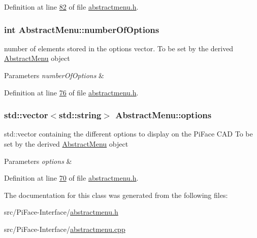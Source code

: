 Definition at line \hyperlink{abstractmenu_8h_source_l00082}{82} of file \hyperlink{abstractmenu_8h_source}{abstractmenu.\+h}.

\subsubsection[{number\+Of\+Options}]{\setlength{\rightskip}{0pt plus 5cm}int Abstract\+Menu\+::number\+Of\+Options\hspace{0.3cm}{\ttfamily [protected]}}\hypertarget{classAbstractMenu_a6caff7f6281c6c2912e5f808c2906123}{}\label{classAbstractMenu_a6caff7f6281c6c2912e5f808c2906123}


number of elements stored in the options vector. To be set by the derived \hyperlink{classAbstractMenu}{Abstract\+Menu} object 


\begin{DoxyParams}{Parameters}
{\em number\+Of\+Options} & \\
\hline
\end{DoxyParams}


Definition at line \hyperlink{abstractmenu_8h_source_l00076}{76} of file \hyperlink{abstractmenu_8h_source}{abstractmenu.\+h}.

\subsubsection[{options}]{\setlength{\rightskip}{0pt plus 5cm}std\+::vector$<$std\+::string$>$ Abstract\+Menu\+::options\hspace{0.3cm}{\ttfamily [protected]}}\hypertarget{classAbstractMenu_a990dc4299fbe86152487fd35d46a403b}{}\label{classAbstractMenu_a990dc4299fbe86152487fd35d46a403b}


std\+::vector containing the different options to display on the Pi\+Face C\+AD To be set by the derived \hyperlink{classAbstractMenu}{Abstract\+Menu} object 


\begin{DoxyParams}{Parameters}
{\em options} & \\
\hline
\end{DoxyParams}


Definition at line \hyperlink{abstractmenu_8h_source_l00070}{70} of file \hyperlink{abstractmenu_8h_source}{abstractmenu.\+h}.



The documentation for this class was generated from the following files\+:\begin{DoxyCompactItemize}
\item 
src/\+Pi\+Face-\/\+Interface/\hyperlink{abstractmenu_8h}{abstractmenu.\+h}\item 
src/\+Pi\+Face-\/\+Interface/\hyperlink{abstractmenu_8cpp}{abstractmenu.\+cpp}\end{DoxyCompactItemize}
